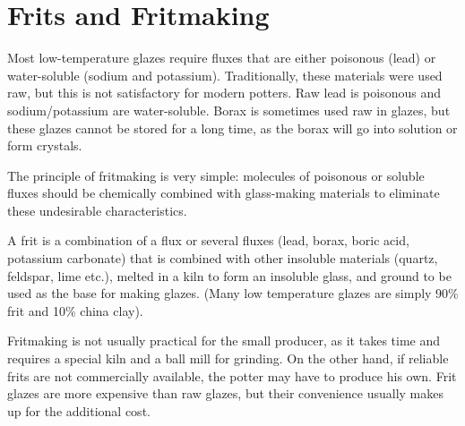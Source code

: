\chapter{Frits and Fritmaking}
\label{sec:frits}
Most low-temperature glazes require fluxes that are either poisonous (lead) or 
water-soluble (sodium and potassium). Traditionally, these materials were used 
raw, but this is not satisfactory for modern potters. Raw lead is poisonous and 
sodium/potassium are water-soluble. Borax is sometimes used raw in glazes, but 
these glazes cannot be stored for a long time, as the borax will go into 
solution or form crystals.

The principle of fritmaking is very simple: molecules of poisonous or soluble 
fluxes should be chemically combined with glass-making materials to eliminate 
these undesirable characteristics.

A frit is a combination of a flux or several fluxes (lead, borax, boric acid, 
potassium carbonate) that is combined with other insoluble materials (quartz, 
feldspar, lime etc.), melted in a kiln to form an insoluble glass, and ground 
to be used as the base for making glazes. (Many low temperature glazes are 
simply 90\% frit and 10\% china clay).

Fritmaking is not usually practical for the small producer, as it takes time 
and requires a special kiln and a ball mill for grinding. On the other hand, if 
reliable frits are not commercially available, the potter may have to produce 
his own. Frit glazes are more expensive than raw glazes, but their convenience 
usually makes up for the additional cost.

